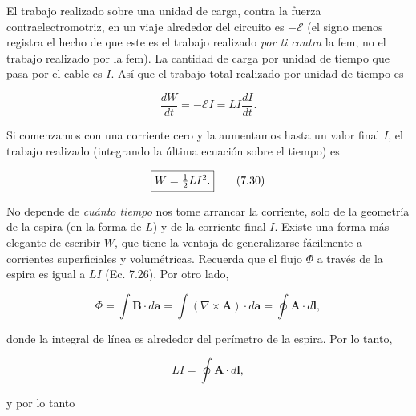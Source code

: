 \documentclass[12pt,a4paper]{report}
\newcommand{\esp}{\vspace{0.5cm}}
\begin{document}
	\esp
	
	El trabajo realizado sobre una unidad de carga, contra la fuerza contraelectromotriz, en un viaje alrededor del circuito es $-\mathcal{E}$ (el signo menos registra el hecho de que este es el trabajo realizado \textit{por ti contra} la fem, no el trabajo realizado por la fem). La cantidad de carga por unidad de tiempo que pasa por el cable es $I$. Así que el trabajo total realizado por unidad de tiempo es
	
	\esp
	
	\begin{equation}
		\frac{dW}{dt} = -\mathcal{E} I = L I \frac{dI}{dt}.
	\end{equation}
	
	\esp
	
	Si comenzamos con una corriente cero y la aumentamos hasta un valor final $I$, el trabajo realizado (integrando la última ecuación sobre el tiempo) es
	
	\esp
	
	\begin{equation}
		\fbox{$W = \frac{1}{2} L I^2.$} \tag{7.30}
	\end{equation}
	
	\esp
	
	No depende de \textit{cuánto tiempo} nos tome arrancar la corriente, solo de la geometría de la espira (en la forma de $L$) y de la corriente final $I$. Existe una forma más elegante de escribir $W$, que tiene la ventaja de generalizarse fácilmente a corrientes superficiales y volumétricas. Recuerda que el flujo $\Phi$ a través de la espira es igual a $LI$ (Ec. 7.26). Por otro lado,
	
	\esp
	
	\begin{equation}
		\Phi = \int \mathbf{B} \cdot d\mathbf{a} = \int (\nabla \times \mathbf{A}) \cdot d\mathbf{a} = \oint \mathbf{A} \cdot d\mathbf{l},
	\end{equation}
	
	\esp
	
	donde la integral de línea es alrededor del perímetro de la espira. Por lo tanto,
	
	\esp
	
	\begin{equation}
		LI = \oint \mathbf{A} \cdot d\mathbf{l},
	\end{equation}
	
	\esp
	
	y por lo tanto
	
	\esp
	
\end{document}
